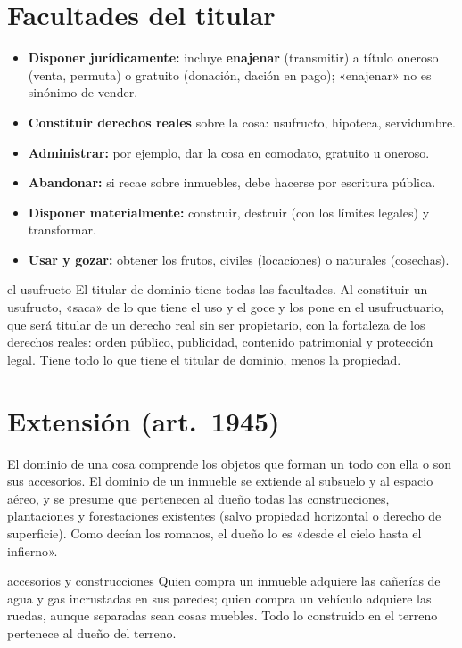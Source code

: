 \documentclass[12pt,oneside]{book}
\begin{document}
\section{Facultades del titular}

\begin{itemize}
    \item \textbf{Disponer jurídicamente:} incluye \textbf{enajenar} (transmitir) a título oneroso (venta, permuta) o gratuito (donación, dación en pago); «enajenar» no es sinónimo de vender.
    \item \textbf{Constituir derechos reales} sobre la cosa: usufructo, hipoteca, servidumbre.
    \item \textbf{Administrar:} por ejemplo, dar la cosa en comodato, gratuito u oneroso.
    \item \textbf{Abandonar:} si recae sobre inmuebles, debe hacerse por escritura pública.
    \item \textbf{Disponer materialmente:} construir, destruir (con los límites legales) y transformar.
    \item \textbf{Usar y gozar:} obtener los frutos, civiles (locaciones) o naturales (cosechas).
\end{itemize}

\begin{ejemplo}{el usufructo}
El titular de dominio tiene todas las facultades. Al constituir un usufructo, «saca» de lo que tiene el uso y el goce y los pone en el usufructuario, que será titular de un derecho real sin ser propietario, con la fortaleza de los derechos reales: orden público, publicidad, contenido patrimonial y protección legal. Tiene todo lo que tiene el titular de dominio, menos la propiedad.
\end{ejemplo}

\section{Extensión (art.~1945)}

El dominio de una cosa comprende los objetos que forman un todo con ella o son sus accesorios. El dominio de un inmueble se extiende al subsuelo y al espacio aéreo, y se presume que pertenecen al dueño todas las construcciones, plantaciones y forestaciones existentes (salvo propiedad horizontal o derecho de superficie). Como decían los romanos, el dueño lo es «desde el cielo hasta el infierno».

\begin{ejemplo}{accesorios y construcciones}
Quien compra un inmueble adquiere las cañerías de agua y gas incrustadas en sus paredes; quien compra un vehículo adquiere las ruedas, aunque separadas sean cosas muebles. Todo lo construido en el terreno pertenece al dueño del terreno.
\end{ejemplo}
\end{document}
